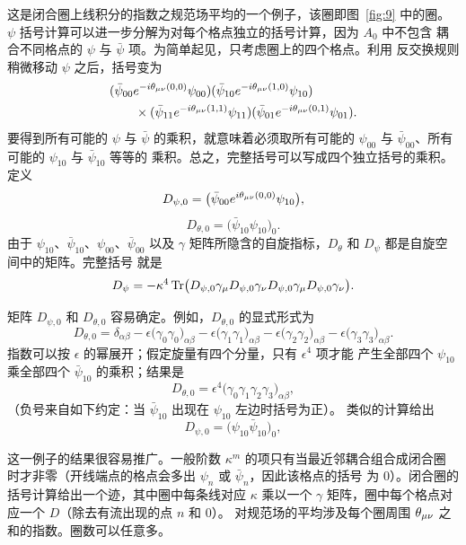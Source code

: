 这是闭合圈上线积分的指数之规范场平均的一个例子，该圈即图~\ref{fig:9} 中的圈。
$\psi$ 括号计算可以进一步分解为对每个格点独立的括号计算，因为 $A_{0}$ 中不包含
耦合不同格点的 $\psi$ 与 $\bar\psi$ 项。为简单起见，只考虑圈上的四个格点。利用
反交换规则稍微移动 $\psi$ 之后，括号变为
\[
\begin{split}
&(\bar\psi_{00}e^{-i\theta_{\mu\nu}(0,0)}\psi_{00})
 (\bar\psi_{10}e^{-i\theta_{\mu\nu}(1,0)}\psi_{10})\\
&\qquad\times
 (\bar\psi_{11}e^{-i\theta_{\mu\nu}(1,1)}\psi_{11})
 (\bar\psi_{01}e^{-i\theta_{\mu\nu}(0,1)}\psi_{01}).
\end{split}
\]
要得到所有可能的 $\psi$ 与 $\bar\psi$ 的乘积，就意味着必须取所有可能的
$\psi_{00}$ 与 $\bar\psi_{00}$、所有可能的 $\psi_{10}$ 与 $\bar\psi_{10}$ 等等的
乘积。总之，完整括号可以写成四个独立括号的乘积。定义
\begin{equation}
D_{\psi,0} = \bigl(\bar\psi_{00}e^{i\theta_{\mu\nu}(0,0)}\psi_{10}\bigr),
\label{eq:3.39}
\end{equation}
\begin{equation}
D_{\theta,0} = \bigl(\bar\psi_{10}\psi_{10}\bigr)_{0}.
\label{eq:3.40}
\end{equation}
由于 $\psi_{10}$、$\bar\psi_{10}$、$\psi_{00}$、$\bar\psi_{00}$ 以及 $\gamma$
矩阵所隐含的自旋指标，$D_{\theta}$ 和 $D_{\psi}$ 都是自旋空间中的矩阵。完整括号
就是
\begin{equation}
D_{\psi} = -\kappa^{4}\operatorname{Tr}\bigl(D_{\psi,0}\gamma_{\mu}
  D_{\psi,0}\gamma_{\nu}D_{\psi,0}\gamma_{\mu}D_{\psi,0}\gamma_{\nu}\bigr).
\label{eq:3.41}
\end{equation}

矩阵 $D_{\psi,0}$ 和 $D_{\theta,0}$ 容易确定。例如，$D_{\theta,0}$ 的显式形式为
\begin{equation}
D_{\theta,0} = \delta_{\alpha\beta}
  - \epsilon\bigl(\gamma_{0}\gamma_{0}\bigr)_{\alpha\beta}
  - \epsilon\bigl(\gamma_{1}\gamma_{1}\bigr)_{\alpha\beta}
  - \epsilon\bigl(\gamma_{2}\gamma_{2}\bigr)_{\alpha\beta}
  - \epsilon\bigl(\gamma_{3}\gamma_{3}\bigr)_{\alpha\beta}.
\label{eq:3.42}
\end{equation}
指数可以按 $\epsilon$ 的幂展开；假定旋量有四个分量，只有 $\epsilon^{4}$ 项才能
产生全部四个 $\psi_{10}$ 乘全部四个 $\bar\psi_{10}$ 的乘积；结果是
\begin{equation}
D_{\theta,0} = \epsilon^{4}\bigl(\gamma_{0}\gamma_{1}\gamma_{2}\gamma_{3}\bigr)_{\alpha\beta},
\label{eq:3.43}
\end{equation}
（负号来自如下约定：当 $\bar\psi_{10}$ 出现在 $\psi_{10}$ 左边时括号为正）。
类似的计算给出
\begin{equation}
D_{\psi,0} = \bigl(\psi_{10}\bar\psi_{10}\bigr)_{0},
\label{eq:3.44}
\end{equation}

这一例子的结果很容易推广。一般阶数 $\kappa^{m}$ 的项只有当最近邻耦合组合成闭合圈
时才非零（开线端点的格点会多出 $\psi_{n}$ 或 $\bar\psi_{n}$，因此该格点的括号
为 0）。闭合圈的括号计算给出一个迹，其中圈中每条线对应 $\kappa$ 乘以一个
$\gamma$ 矩阵，圈中每个格点对应一个 $D$（除去有流出现的点 $n$ 和 $0$）。
对规范场的平均涉及每个圈周围 $\theta_{\mu\nu}$ 之和的指数。圈数可以任意多。
